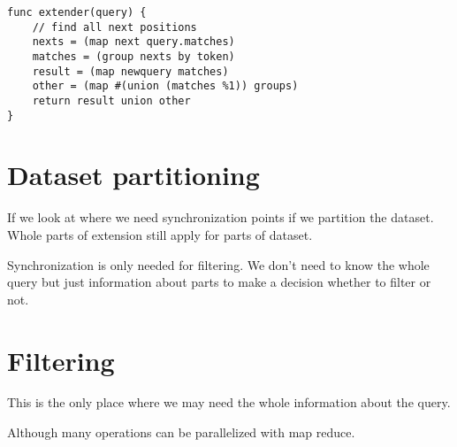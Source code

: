 \begin{verbatim}
func extender(query) {
	// find all next positions
	nexts = (map next query.matches)
	matches = (group nexts by token)
	result = (map newquery matches)
	other = (map #(union (matches %1)) groups)
	return result union other
}
\end{verbatim}

\section{Dataset partitioning}

If we look at where we need synchronization points if we partition 
the dataset. Whole parts of extension still apply for parts of dataset.

Synchronization is only needed for filtering. We don't need to know the 
whole query but just information about parts to make a decision whether to filter or not.


\section{Filtering}

This is the only place where we may need the whole information about the query.

Although many operations can be parallelized with map reduce.



